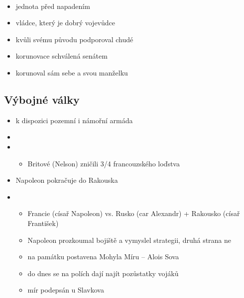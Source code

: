 \paragraph{}
\begin{itemize}
\item jednota před napadením
\item vládce, který je dobrý vojevůdce
\item kvůli svému původu podporoval chudé
\item korunovace schválená senátem
\item korunoval sám sebe a svou manželku
\end{itemize}

\subsection{Výbojné války}
\begin{itemize}
\item k dispozici pozemní i námořní armáda
\item {}
\item {}
	\begin{itemize}
	\item Britové (Nelson) zničili 3/4 francouzského loďstva
	\end{itemize}
\item Napoleon pokračuje do Rakouska
\item {}
	\begin{itemize}
	\item Francie (císař Napoleon) vs. Rusko (car Alexandr) + Rakousko (císař František)
	\item Napoleon prozkoumal bojiště a vymyslel strategii, druhá strana ne
	\item na památku postavena Mohyla Míru -- Alois Sova
	\item do dnes se na polích dají najít pozůstatky vojáků
	\item mír podepsán u Slavkova
	\end{itemize}
\end{itemize}

